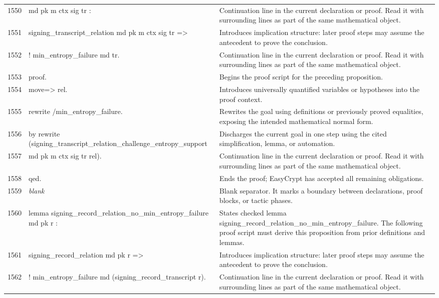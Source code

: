 \documentclass[10pt]{article}
\begin{document}
\begin{longtable}{r L{0.53\textwidth} L{0.37\textwidth}}
1550 & {\ttfamily\scriptsize   md pk m ctx sig tr :} & Continuation line in the current declaration or proof.  Read it with surrounding lines as part of the same mathematical object. \\
1551 & {\ttfamily\scriptsize   signing\_transcript\_relation md pk m ctx sig tr =>} & Introduces implication structure: later proof steps may assume the antecedent to prove the conclusion. \\
1552 & {\ttfamily\scriptsize   ! min\_entropy\_failure md tr.} & Continuation line in the current declaration or proof.  Read it with surrounding lines as part of the same mathematical object. \\
1553 & {\ttfamily\scriptsize proof.} & Begins the proof script for the preceding proposition. \\
1554 & {\ttfamily\scriptsize move=> rel.} & Introduces universally quantified variables or hypotheses into the proof context. \\
1555 & {\ttfamily\scriptsize rewrite /min\_entropy\_failure.} & Rewrites the goal using definitions or previously proved equalities, exposing the intended mathematical normal form. \\
1556 & {\ttfamily\scriptsize by rewrite (signing\_transcript\_relation\_challenge\_entropy\_support} & Discharges the current goal in one step using the cited simplification, lemma, or automation. \\
1557 & {\ttfamily\scriptsize               md pk m ctx sig tr rel).} & Continuation line in the current declaration or proof.  Read it with surrounding lines as part of the same mathematical object. \\
1558 & {\ttfamily\scriptsize qed.} & Ends the proof; EasyCrypt has accepted all remaining obligations. \\
1559 & {\ttfamily\scriptsize \emph{blank}} & Blank separator.  It marks a boundary between declarations, proof blocks, or tactic phases. \\
1560 & {\ttfamily\scriptsize lemma signing\_record\_relation\_no\_min\_entropy\_failure md pk r :} & States checked lemma signing\_record\_relation\_no\_min\_entropy\_failure.  The following proof script must derive this proposition from prior definitions and lemmas. \\
1561 & {\ttfamily\scriptsize   signing\_record\_relation md pk r =>} & Introduces implication structure: later proof steps may assume the antecedent to prove the conclusion. \\
1562 & {\ttfamily\scriptsize   ! min\_entropy\_failure md (signing\_record\_transcript r).} & Continuation line in the current declaration or proof.  Read it with surrounding lines as part of the same mathematical object. \\

\end{longtable}
\end{document}
